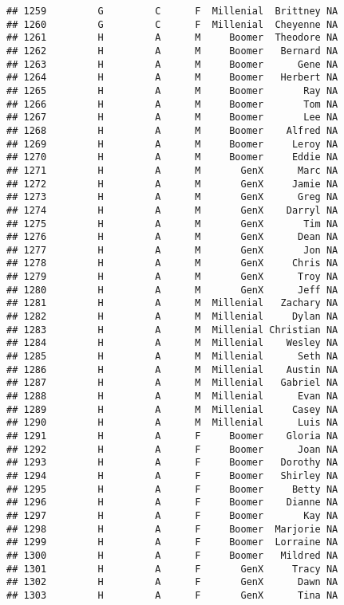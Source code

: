 \documentclass[
]{article}
\begin{document}
\begin{verbatim}
## 1259         G         C      F  Millenial  Brittney NA
## 1260         G         C      F  Millenial  Cheyenne NA
## 1261         H         A      M     Boomer  Theodore NA
## 1262         H         A      M     Boomer   Bernard NA
## 1263         H         A      M     Boomer      Gene NA
## 1264         H         A      M     Boomer   Herbert NA
## 1265         H         A      M     Boomer       Ray NA
## 1266         H         A      M     Boomer       Tom NA
## 1267         H         A      M     Boomer       Lee NA
## 1268         H         A      M     Boomer    Alfred NA
## 1269         H         A      M     Boomer     Leroy NA
## 1270         H         A      M     Boomer     Eddie NA
## 1271         H         A      M       GenX      Marc NA
## 1272         H         A      M       GenX     Jamie NA
## 1273         H         A      M       GenX      Greg NA
## 1274         H         A      M       GenX    Darryl NA
## 1275         H         A      M       GenX       Tim NA
## 1276         H         A      M       GenX      Dean NA
## 1277         H         A      M       GenX       Jon NA
## 1278         H         A      M       GenX     Chris NA
## 1279         H         A      M       GenX      Troy NA
## 1280         H         A      M       GenX      Jeff NA
## 1281         H         A      M  Millenial   Zachary NA
## 1282         H         A      M  Millenial     Dylan NA
## 1283         H         A      M  Millenial Christian NA
## 1284         H         A      M  Millenial    Wesley NA
## 1285         H         A      M  Millenial      Seth NA
## 1286         H         A      M  Millenial    Austin NA
## 1287         H         A      M  Millenial   Gabriel NA
## 1288         H         A      M  Millenial      Evan NA
## 1289         H         A      M  Millenial     Casey NA
## 1290         H         A      M  Millenial      Luis NA
## 1291         H         A      F     Boomer    Gloria NA
## 1292         H         A      F     Boomer      Joan NA
## 1293         H         A      F     Boomer   Dorothy NA
## 1294         H         A      F     Boomer   Shirley NA
## 1295         H         A      F     Boomer     Betty NA
## 1296         H         A      F     Boomer    Dianne NA
## 1297         H         A      F     Boomer       Kay NA
## 1298         H         A      F     Boomer  Marjorie NA
## 1299         H         A      F     Boomer  Lorraine NA
## 1300         H         A      F     Boomer   Mildred NA
## 1301         H         A      F       GenX     Tracy NA
## 1302         H         A      F       GenX      Dawn NA
## 1303         H         A      F       GenX      Tina NA

\end{verbatim}
\end{document}
